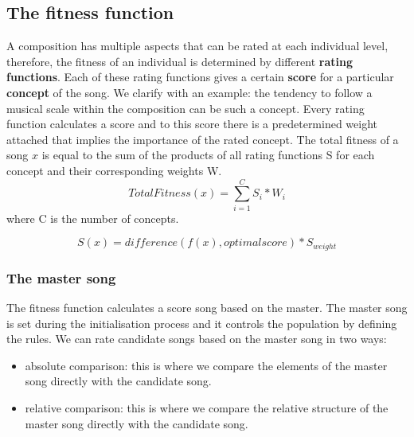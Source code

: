 
\subsection{The fitness function}
A composition has multiple aspects that can be rated at each individual level, therefore, the fitness of an individual is determined by different \textbf{rating functions}. Each of these rating functions gives a certain \textbf{score} for a particular \textbf{concept} of the song. We clarify with an example: the tendency to follow a musical scale within the composition can be such a concept. Every rating function calculates a score and to this score there is a predetermined weight attached that implies the importance of the rated concept. The total fitness of a song $x$ is equal to the sum of the products of all rating functions S for each concept and their corresponding weights W.
\[ TotalFitness(x) = \sum_{i=1}^{C} S_{i} * W_{i}\] 
where C is the number of concepts.


\[ S(x) =  difference( f(x) ,optimalscore) * S_{weight} \]

\subsubsection{The master song}
The fitness function calculates a score song based on the master. The master song is set during the initialisation process and it controls the population by defining the rules. We can rate candidate songs based on the master song in two ways:
\begin{itemize}
    \item absolute comparison: this is where we compare the elements of the master song directly with the candidate song.
    \item relative comparison: this is where we compare the relative structure of the master song directly with the candidate song.
\end{itemize}

